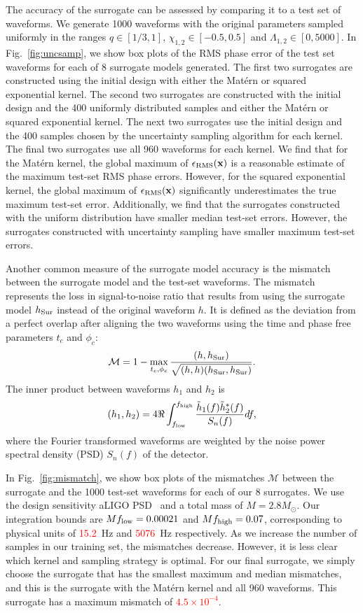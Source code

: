 \documentclass[prd,aps,letter,twocolumn,floatfix,notitlepage,nofootinbib]{revtex4-1}
\def\bx{\mathbf{x}}
\newcommand{\red}[1]{\textcolor{red}{#1}}
\begin{document}
The accuracy of the surrogate can be assessed by comparing it to a test set of waveforms. We generate 1000 waveforms with the original parameters sampled uniformly in the ranges $q \in [1/3, 1]$, $\chi_{1,2} \in [-0.5, 0.5]$ and $\Lambda_{1,2} \in [0, 5000]$. In Fig.~\ref{fig:uncsamp}, we show box plots of the RMS phase error of the test set waveforms for each of 8 surrogate models generated. The first two surrogates are constructed using the initial design with either the Mat\'{e}rn or squared exponential kernel. The second two surrogates are constructed with the initial design and the 400 uniformly distributed samples and either the Mat\'{e}rn or squared exponential kernel. The next two surrogates use the initial design and the 400 samples chosen by the uncertainty sampling algorithm for each kernel. The final two surrogates use all 960 waveforms for each kernel. We find that for the Mat\'{e}rn kernel, the global maximum of $\epsilon_{\rm RMS}(\bx)$ is a reasonable estimate of the maximum test-set RMS phase errors. However, for the squared exponential kernel, the global maximum of $\epsilon_{\rm RMS}(\bx)$ significantly underestimates the true maximum test-set error. Additionally, we find that the surrogates constructed with the uniform distribution have smaller median test-set errors. However, the surrogates constructed with uncertainty sampling have smaller maximum test-set errors.

Another common measure of the surrogate model accuracy is the mismatch between the surrogate model and the test-set waveforms.
The mismatch represents the loss in signal-to-noise ratio that results from using the surrogate model $h_{\rm Sur}$ instead of the original waveform $h$. It is defined as the deviation from a perfect overlap after aligning the two waveforms using the time and phase free parameters $t_c$ and $\phi_c$:
\begin{equation}
\mathcal{M} = 1 - \max_{t_c, \phi_c} \frac{(h, h_{\rm Sur})} {\sqrt{(h, h) (h_{\rm Sur}, h_{\rm Sur})}}.
\end{equation}
The inner product between waveforms $h_1$ and $h_2$ is
\begin{equation}
(h_1, h_2) = 4 \Re \int_{f_{\rm low}}^{f_{\rm high}} \frac{\tilde h_1(f) \tilde h^*_2(f)} {S_n(f)} df,
\end{equation}
where the Fourier transformed waveforms are weighted by the noise power spectral density (PSD) $S_n(f)$ of the detector.

In Fig.~\ref{fig:mismatch}, we show box plots of the mismatches $\mathcal{M}$ between the surrogate and the 1000 test-set waveforms for each of our 8 surrogates. We use the design sensitivity aLIGO PSD~\cite{Aasi:2013wya} and a total mass of $M=2.8M_\odot$. Our integration bounds are $Mf_{\rm low} = 0.00021$ and $Mf_{\rm high} = 0.07$, corresponding to physical units of \red{15.2}~Hz and \red{5076}~Hz respectively. As we increase the number of samples in our training set, the mismatches decrease. However, it is less clear which kernel and sampling strategy is optimal. For our final surrogate, we simply choose the surrogate that has the smallest maximum and median mismatches, and this is the surrogate with the Mat\'{e}rn kernel and all 960 waveforms. This surrogate has a maximum mismatch of \red{$4.5\times 10^{-4}$}. 
\end{document}
